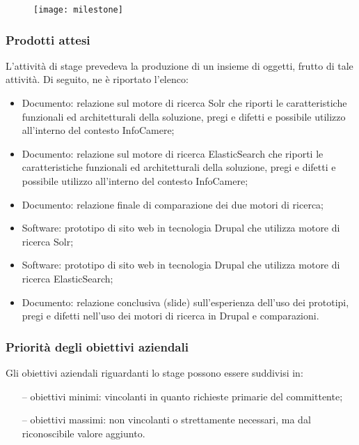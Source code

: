 		\begin{figure}[htbp]
			\begin{center}
				\texttt{[image: milestone]}
			\end{center}
		\end{figure}
	
		\subsubsection{Prodotti attesi}		
		L'attività di stage prevedeva la produzione di un insieme di oggetti, frutto di tale attività. Di seguito, ne è riportato l'elenco:
		
		\begin{itemize}
			\item {Documento: relazione sul motore di ricerca \gls{Solr} che riporti le caratteristiche funzionali ed architetturali della soluzione, pregi e difetti e possibile utilizzo all'interno del contesto InfoCamere;}
			\item {Documento: relazione sul motore di ricerca \gls{ElasticSearch} che riporti le caratteristiche funzionali ed architetturali della soluzione, pregi e difetti e possibile utilizzo all'interno del contesto InfoCamere;}
			\item {Documento: relazione finale di comparazione dei due motori di ricerca;}
			\item {Software: prototipo di sito web in tecnologia \gls{Drupal} che utilizza motore di ricerca \gls{Solr};}
			\item {Software: prototipo di sito web in tecnologia \gls{Drupal} che utilizza motore di ricerca \gls{ElasticSearch};}
			\item {Documento: relazione conclusiva (slide) sull'esperienza dell'uso dei prototipi, pregi e difetti nell'uso dei motori di ricerca in \gls{Drupal} e comparazioni}.
		\end{itemize}
	
		\subsubsection{Priorità degli obiettivi aziendali}
		Gli obiettivi aziendali riguardanti lo stage possono essere suddivisi in:
		\begin{itemize}
			 \item[--] {obiettivi minimi: vincolanti in quanto richieste primarie del committente;}
			 \item[--] {obiettivi massimi: non vincolanti o strettamente necessari, ma dal riconoscibile valore aggiunto.}
	 	\end{itemize}
 	
